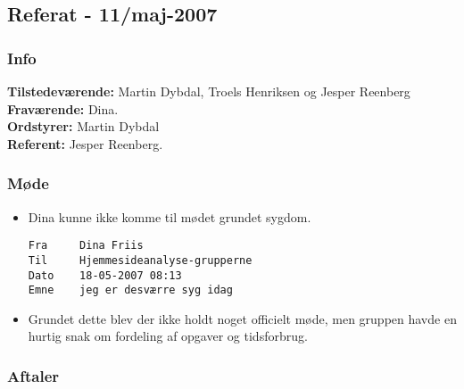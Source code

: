 \subsection{Referat - 11/maj-2007}

\subsubsection{Info}

\textbf{Tilstedeværende:} Martin Dybdal, Troels Henriksen og Jesper Reenberg\\
\textbf{Fraværende:} Dina.\\
\textbf{Ordstyrer:} Martin Dybdal\\
\textbf{Referent:} Jesper Reenberg.

\subsubsection{Møde}

\begin{itemize}

\item Dina kunne ikke komme til mødet grundet sygdom.
\begin{verbatim}
Fra 	Dina Friis
Til 	Hjemmesideanalyse-grupperne
Dato 	18-05-2007 08:13
Emne 	jeg er desværre syg idag
\end{verbatim}


\item Grundet dette blev der ikke holdt noget officielt møde, men gruppen havde en hurtig snak om fordeling af opgaver og tidsforbrug.

\end{itemize}

\subsubsection{Aftaler}

